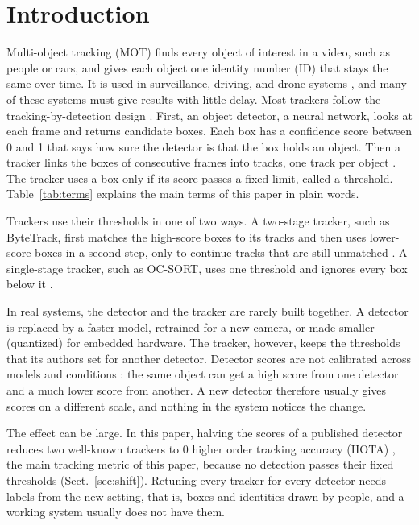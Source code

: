 \section{Introduction}\label{sec:intro}

Multi-object tracking (MOT) finds every object of interest in a video, such as
people or cars, and gives each object one identity number (ID) that stays the
same over time. It is used in surveillance, driving, and drone systems
\cite{zhu2022visdrone,wu2022uavsurvey}, and many of these systems must give
results with little delay. Most trackers follow the tracking-by-detection
design \cite{adzemovic2026survey}. First, an object detector, a neural network,
looks at each frame and returns candidate boxes. Each box has a confidence
score between 0 and 1 that says how sure the detector is that the box holds an
object. Then a tracker links the boxes of consecutive frames into tracks, one
track per object \cite{bewley2016sort,zhang2022bytetrack,cao2023ocsort}. The
tracker uses a box only if its score passes a fixed limit, called a threshold.
Table~\ref{tab:terms} explains the main terms of this paper in plain words.

Trackers use their thresholds in one of two ways. A two-stage tracker, such as
ByteTrack, first matches the high-score boxes to its tracks and then uses
lower-score boxes in a second step, only to continue tracks that are still
unmatched \cite{zhang2022bytetrack}. A single-stage tracker, such as OC-SORT,
uses one threshold and ignores every box below it \cite{cao2023ocsort}.

In real systems, the detector and the tracker are rarely built together. A
detector is replaced by a faster model, retrained for a new camera, or made
smaller (quantized) for embedded hardware. The tracker, however, keeps the
thresholds that its authors set for another detector. Detector scores are not
calibrated across models and conditions \cite{kuppers2020detcalib}: the same
object can get a high score from one detector and a much lower score from
another. A new detector therefore usually gives scores on a different scale,
and nothing in the system notices the change.

The effect can be large. In this paper, halving the scores of a published
detector reduces two well-known trackers to 0 higher order tracking accuracy
(HOTA) \cite{luiten2021hota}, the main tracking metric of this paper, because
no detection passes their fixed thresholds (Sect.~\ref{sec:shift}). Retuning
every tracker for every detector needs labels from the new setting, that is,
boxes and identities drawn by people, and a working system usually does not
have them.

